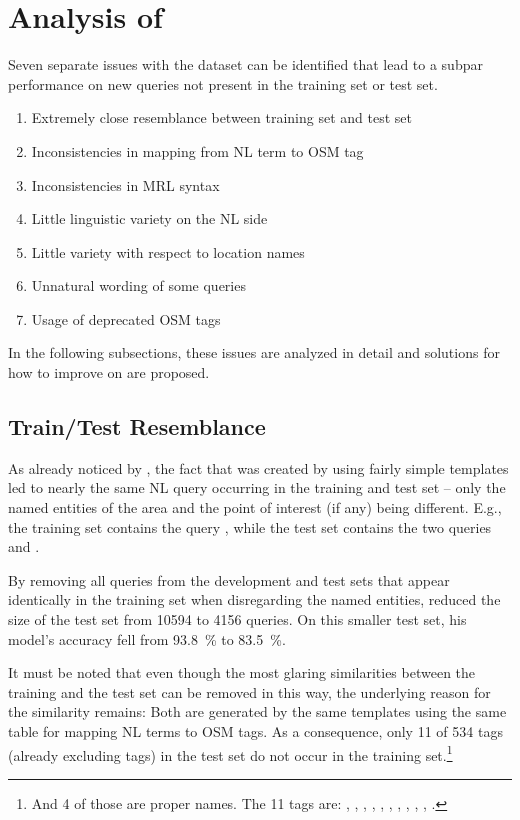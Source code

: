 \section{Analysis of \nlmapstwo{}}

Seven separate issues with the \nlmapstwo{} dataset can be identified that lead
to a subpar performance on new queries not present in the training set or test
set.

\begin{enumerate}
\item Extremely close resemblance between training set and test set
\item Inconsistencies in mapping from NL term to OSM tag
\item Inconsistencies in MRL syntax
\item Little linguistic variety on the NL side
\item Little variety with respect to location names
\item Unnatural wording of some queries
\item Usage of deprecated OSM tags
\end{enumerate}
In the following subsections, these issues are analyzed in detail and solutions
for how to improve on \nlmapstwo{} are proposed.

\subsection{Train/Test Resemblance}
\label{sec:train-test-resemblance}

As already noticed by \textcite{staniek-2020}, the fact that \nlmapstwo{} was
created by using fairly simple templates led to nearly the same NL query
occurring in the training and test set – only the named entities of the area and
the point of interest (if any) being different. E.g., the training set contains
the query , while the test set contains the
two queries  and .

By removing all queries from the development and test sets that appear
identically in the training set when disregarding the named entities,
\textcite{staniek-2020} reduced the size of the test set from \num{10594}
to \num{4156} queries. On this smaller test set, his model’s accuracy fell from
\SI{93.8}{\%} to \SI{83.5}{\%}.

It must be noted that even though the most glaring similarities between the
training and the test set can be removed in this way, the underlying reason for
the similarity remains: Both are generated by the same templates using the same
table for mapping NL terms to OSM tags. As a consequence, only \num{11} of
\num{534} tags (already excluding  tags) in the test set do not
occur in the training set.\footnote{And \num{4} of those are proper names. The
  \num{11} tags are: ,
  , , ,
  , , ,
  , ,
  , .}

